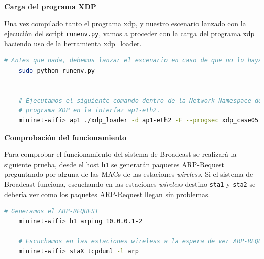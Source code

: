 \vspace{0.5cm}
\textbf{Carga del programa XDP}\\
\par

Una vez compilado tanto el programa \gls{xdp}, y nuestro escenario lanzado con la ejecución del script \texttt{runenv.py}, vamos a proceder con la carga del programa \gls{xdp} haciendo uso de la herramienta xdp\_loader.

\begin{lstlisting}[language= bash, style=Consola, caption={Carga del programa XDP - Case05},label=code:case05_xdp_wifi_load]
    # Antes que nada, debemos lanzar el escenario en caso de que no lo hayamos hecho todavía.
    sudo python runenv.py
    
    
    # Ejecutamos el siguiente comando dentro de la Network Namespace del AP1, cargando así el
    # programa XDP en la interfaz ap1-eth2.
    mininet-wifi> ap1 ./xdp_loader -d ap1-eth2 -F --progsec xdp_case05 -S
\end{lstlisting}



\vspace{0.5cm}
\textbf{Comprobación del funcionamiento}\\
\par

Para comprobar el funcionamiento del sistema de Broadcast se realizará la siguiente prueba, desde el host \texttt{h1} se generarán paquetes ARP-Request preguntando por alguna de las MACs de las estaciones \textit{wireless}. Si el sistema de Broadcast funciona, escuchando en las estaciones \textit{wireless} destino \texttt{sta1} y \texttt{sta2} se debería ver como los paquetes ARP-Request llegan sin problemas.

\begin{lstlisting}[language= bash, style=Consola, caption={Comprobación del funcionamiento - Case05},label=code:case05_xdp_wifi_func1]
    # Generamos el ARP-REQUEST
    mininet-wifi> h1 arping 10.0.0.1-2
    
    # Escuchamos en las estaciones wireless a la espera de ver ARP-REQUEST.
    mininet-wifi> staX tcpduml -l arp
\end{lstlisting}

\newpage

